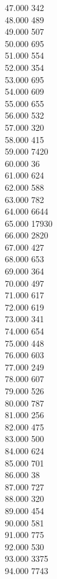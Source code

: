 { 47.000	342 \\
 48.000	489 \\
 49.000	507 \\
 50.000	695 \\
 51.000	554 \\
 52.000	354 \\
 53.000	695 \\
 54.000	609 \\
 55.000	655 \\
 56.000	532 \\
 57.000	320 \\
 58.000	415 \\
 59.000	7420 \\
 60.000	36 \\
 61.000	624 \\
 62.000	588 \\
 63.000	782 \\
 64.000	6644 \\
 65.000	17930 \\
 66.000	2820 \\
 67.000	427 \\
 68.000	653 \\
 69.000	364 \\
 70.000	497 \\
 71.000	617 \\
 72.000	619 \\
 73.000	341 \\
 74.000	654 \\
 75.000	448 \\
 76.000	603 \\
 77.000	249 \\
 78.000	607 \\
 79.000	526 \\
 80.000	787 \\
 81.000	256 \\
 82.000	475 \\
 83.000	500 \\
 84.000	624 \\
 85.000	701 \\
 86.000	38 \\
 87.000	727 \\
 88.000	320 \\
 89.000	454 \\
 90.000	581 \\
 91.000	775 \\
 92.000	530 \\
 93.000	3375 \\
 94.000	7743 \\
}
